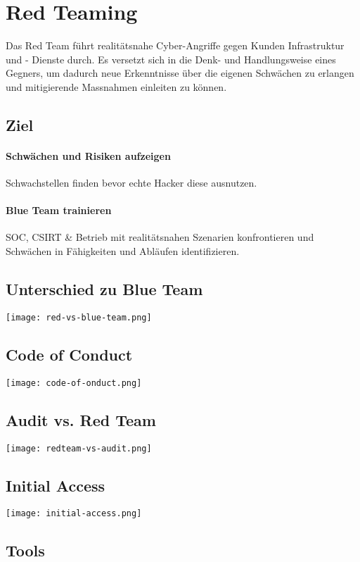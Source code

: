 \section{Red Teaming}\label{sec:redteam}
Das Red Team führt realitätsnahe Cyber-Angriffe gegen Kunden Infrastruktur und - Dienste durch. 
Es versetzt sich in die Denk- und Handlungsweise eines Gegners, um dadurch neue Erkenntnisse über die eigenen Schwächen zu erlangen und mitigierende Massnahmen einleiten zu können. 

 \subsection{Ziel}
\paragraph{Schwächen und Risiken aufzeigen}
Schwachstellen finden bevor echte Hacker diese ausnutzen.
\paragraph{Blue Team trainieren}
SOC, CSIRT \& Betrieb mit realitätsnahen Szenarien konfrontieren und Schwächen in Fähigkeiten und Abläufen identifizieren.

\subsection{Unterschied zu Blue Team}
\texttt{[image: red-vs-blue-team.png]}

\subsection{Code of Conduct}
\texttt{[image: code-of-onduct.png]}

\subsection{Audit vs. Red Team}
\texttt{[image: redteam-vs-audit.png]}

\subsection{Initial Access}
\texttt{[image: initial-access.png]}

\subsection{Tools}

